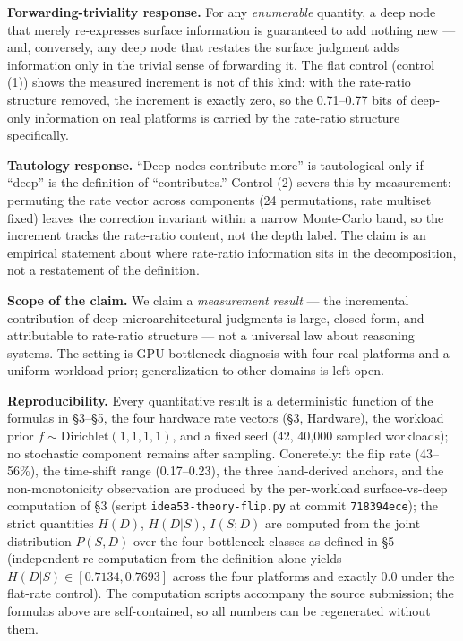 \documentclass[11pt]{article}
\begin{document}
{{{{\textbf{Forwarding-triviality response.} For any \emph{enumerable} quantity, a deep node that merely re-expresses surface information is guaranteed to add nothing new --- and, conversely, any deep node that restates the surface judgment adds information only in the trivial sense of forwarding it. The flat control (control (1)) shows the measured increment is not of this kind: with the rate-ratio structure removed, the increment is exactly zero, so the 0.71--0.77 bits of deep-only information on real platforms is carried by the rate-ratio structure specifically.

\textbf{Tautology response.} ``Deep nodes contribute more'' is tautological only if ``deep'' is the definition of ``contributes.'' Control (2) severs this by measurement: permuting the rate vector across components (24 permutations, rate multiset fixed) leaves the correction invariant within a narrow Monte-Carlo band, so the increment tracks the rate-ratio content, not the depth label. The claim is an empirical statement about where rate-ratio information sits in the decomposition, not a restatement of the definition.

\textbf{Scope of the claim.} We claim a \emph{measurement result} --- the incremental contribution of deep microarchitectural judgments is large, closed-form, and attributable to rate-ratio structure --- not a universal law about reasoning systems. The setting is GPU bottleneck diagnosis with four real platforms and a uniform workload prior; generalization to other domains is left open.

\textbf{Reproducibility.} Every quantitative result is a deterministic function of the formulas in §3--§5, the four hardware rate vectors (§3, Hardware), the workload prior $f \sim \mathrm{Dirichlet}(1,1,1,1)$, and a fixed seed (42, 40{,}000 sampled workloads); no stochastic component remains after sampling. Concretely: the flip rate (43--56\%), the time-shift range (0.17--0.23), the three hand-derived anchors, and the non-monotonicity observation are produced by the per-workload surface-vs-deep computation of §3 (script \texttt{idea53-theory-flip.py} at commit \texttt{718394ece}); the strict quantities $H(D)$, $H(D|S)$, $I(S;D)$ are computed from the joint distribution $P(S,D)$ over the four bottleneck classes as defined in §5 (independent re-computation from the definition alone yields $H(D|S) \in [0.7134, 0.7693]$ across the four platforms and exactly 0.0 under the flat-rate control). The computation scripts accompany the source submission; the formulas above are self-contained, so all numbers can be regenerated without them.

}}}}
\end{document}

